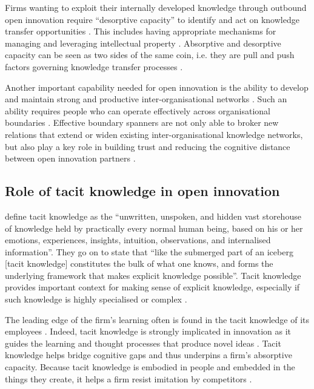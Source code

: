 Firms wanting to exploit their internally developed knowledge through outbound open innovation require \enquote{desorptive capacity} to identify and act on knowledge transfer opportunities \citep{lichtenthaler2010technology}. This includes having appropriate mechanisms for managing and leveraging intellectual property \citep{chesbrough2012open,denford2018absorption}. Absorptive and desorptive capacity can be seen as two sides of the same coin, i.e. they are pull and push factors governing knowledge transfer processes \citep{dell2015absorptive}. \medskip

Another important capability needed for open innovation is the ability to develop and maintain strong and productive inter-organisational networks \citep{chesbrough2012open}. Such an ability requires people who can operate effectively across organisational boundaries \citep{tushman1981boundary,levin2004strength,meyer2010rise}. Effective boundary spanners are not only able to broker new relations that extend or widen existing inter-organisational knowledge networks, but also play a key role in building trust and reducing the cognitive distance between open innovation partners \citep{fleming2007brokerage,goffin2010managing,renzl2008trust,sankowska2013relationships,kucharska2016trust}. 

\subsection{Role of tacit knowledge in open innovation}

\citet{kreutz2014catalyzing} define tacit knowledge as the \enquote{unwritten, unspoken, and hidden vast storehouse of knowledge held by practically every normal human being, based on his or her emotions, experiences, insights, intuition, observations, and internalised information}. They go on to state that \enquote{like the submerged part of an iceberg [tacit knowledge] constitutes the bulk of what one knows, and forms the underlying framework that makes explicit knowledge possible}. Tacit knowledge provides important context for making sense of explicit knowledge, especially if such knowledge is highly specialised or complex \citep{von1994sticky,szulanski1996exploring,leonard1998role,seidler2008use}. \medskip

The leading edge of the firm’s learning often is found in the tacit knowledge of its employees \citep{horvath2000working}. Indeed, tacit knowledge is strongly implicated in innovation as it guides the learning and thought processes that produce novel ideas \citep{leonard1998role,amar2008descriptive,leonard2014knowledge}. Tacit knowledge helps bridge cognitive gaps and thus underpins a firm's absorptive capacity. Because tacit knowledge is embodied in people and embedded in the things they create, it helps a firm resist imitation by competitors \citep{horvath2000working}. \medskip

